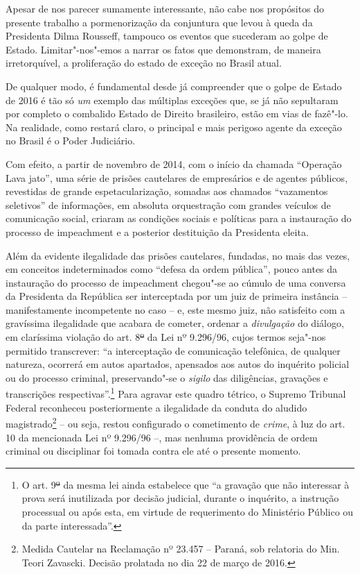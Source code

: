 Apesar de nos parecer sumamente interessante, não cabe nos propósitos do
presente trabalho a pormenorização da conjuntura que levou à queda da
Presidenta Dilma Rousseff, tampouco os eventos que sucederam ao golpe de
Estado. Limitar"-nos"-emos a narrar os fatos que demonstram, de maneira
irretorquível, a proliferação do estado de exceção no Brasil atual.

De qualquer modo, é fundamental desde já compreender que o golpe de
Estado de 2016 é tão só \emph{um} exemplo das múltiplas exceções que, se
já não sepultaram por completo o combalido Estado de Direito brasileiro,
estão em vias de fazê"-lo. Na realidade, como restará claro, o principal
e mais perigoso agente da exceção no Brasil é o Poder Judiciário.

Com efeito, a partir de novembro de 2014, com o início da chamada
``Operação Lava jato'', uma série de prisões cautelares de empresários e
de agentes públicos, revestidas de grande espetacularização, somadas aos
chamados ``vazamentos seletivos'' de informações, em absoluta
orquestração com grandes veículos de comunicação social, criaram as
condições sociais e políticas para a instauração do processo de
impeachment e a posterior destituição da Presidenta eleita.

Além da evidente ilegalidade das prisões cautelares, fundadas, no mais
das vezes, em conceitos indeterminados como ``defesa da ordem pública'',
pouco antes da instauração do processo de impeachment chegou"-se
ao cúmulo de uma conversa da Presidenta da República ser interceptada
por um juiz de primeira instância -- manifestamente incompetente no caso
-- e, este mesmo juiz, não satisfeito com a gravíssima ilegalidade que
acabara de cometer, ordenar a \emph{divulgação} do diálogo, em
claríssima violação do art. 8\sout{º} da Lei nº 9.296/96, cujos termos
seja"-nos permitido transcrever: ``a interceptação de comunicação
telefônica, de qualquer natureza, ocorrerá em autos apartados, apensados
aos autos do inquérito policial ou do processo criminal, preservando"-se
o \emph{sigilo} das diligências, gravações e transcrições
respectivas''.\footnote{O art. 9\sout{º} da mesma lei ainda estabelece
  que ``a gravação que não interessar à prova será inutilizada por
  decisão judicial, durante o inquérito, a instrução processual ou após
  esta, em virtude de requerimento do Ministério Público ou da parte
  interessada''.} Para agravar este quadro tétrico, o Supremo Tribunal
Federal reconheceu posteriormente a ilegalidade da conduta do aludido
magistrado\footnote{Medida Cautelar na Reclamação nº 23.457 -- Paraná,
  sob relatoria do Min. Teori Zavascki. Decisão prolatada no dia 22 de
  março de 2016.} -- ou seja, restou configurado o cometimento de
\emph{crime}, à luz do art. 10 da mencionada Lei nº 9.296/96 --, mas
nenhuma providência de ordem criminal ou disciplinar foi tomada contra
ele até o presente momento.

